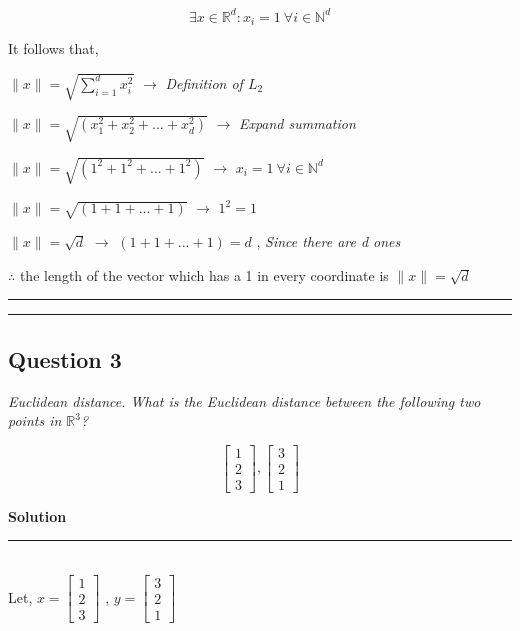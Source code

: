 \documentclass{article}
\begin{document}
$$\exists x \in \mathbb{R}^d : x_i = 1 \ \forall i \in \mathbb{N}^d$$

It follows that,

$\|x\| = \sqrt{\sum_{i=1}^{d} x_i^2}$ $\rightarrow$ \textit{Definition of $L_2$}

$\|x\| = \sqrt{\left(x_1^{2}+x_2^{2}+...+x_d^{2}\right)}$ $\rightarrow$ \textit{Expand summation}

$\|x\| = \sqrt{\left(1^{2}+1^{2}+...+1^{2}\right)}$ $\rightarrow$ $x_i = 1 \ \forall i \in \mathbb{N}^d$  

$\|x\| = \sqrt{\left(1+1+...+1\right)}$ $\rightarrow$ $1^2 = 1$  

$\|x\| = \sqrt{d}$ $\rightarrow$ $\left(1+1+...+1\right) = d$ , \textit{Since there are d ones}

$\therefore$ the length of the vector which has a 1 in every coordinate is $\|x\| = \sqrt{d}$\\

\noindent\rule{\textwidth}{0.4pt}

\noindent\rule{\textwidth}{0.4pt}
\newpage
\subsection*{Question 3}

\textit{Euclidean distance. What is the Euclidean distance between the following two points in $\mathbb{R}^3$?}

   $$
   \begin{bmatrix}
   1 \\
   2 \\
   3
   \end{bmatrix},
   \begin{bmatrix}
   3 \\
   2 \\
   1
   \end{bmatrix}
   $$

   \textbf{Solution} 

\noindent\rule{\textwidth}{0.4pt}\\

   Let, $x = \begin{bmatrix} 1 \\ 2 \\ 3 \end{bmatrix}$ , $y = \begin{bmatrix} 3 \\ 2 \\ 1 \end{bmatrix}$
\end{document}
